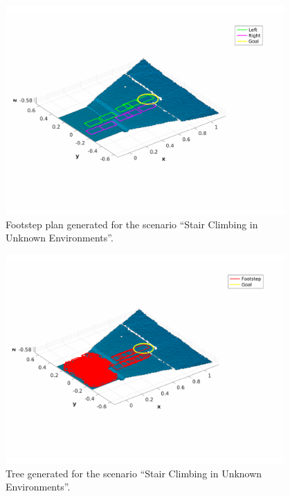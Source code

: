 \begin{figure}
    \centering
    \includegraphics[width=0.95\textwidth]
        {figures/experiments/unknown-env/footstep-plan.pdf}
    \caption{Footstep plan generated for the scenario ``Stair Climbing in 
        Unknown Environments''.}
    \label{fig:experiments:unknown-env:footstep-plan}
\end{figure}
\begin{figure}
    \centering
    \includegraphics[width=0.95\textwidth]
        {figures/experiments/unknown-env/rrt-tree.pdf}
    \caption{Tree generated for the scenario ``Stair Climbing in 
        Unknown Environments''.}
    \label{fig:experiments:unknown-env:rrt-tree}
\end{figure}

